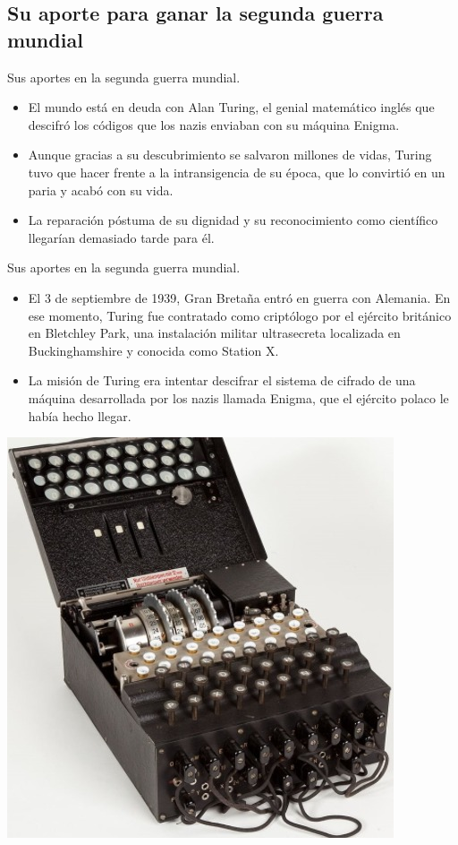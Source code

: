 \documentclass{beamer}
\begin{document}
\subsection{Su aporte para ganar la segunda guerra mundial}
\begin{frame}{Sus aportes en la segunda guerra mundial.}
    \begin{itemize}
        \item El mundo está en deuda con Alan Turing, el genial matemático inglés que descifró los códigos que los nazis enviaban con su máquina Enigma.\\\pause
        \item Aunque gracias a su descubrimiento se salvaron millones de vidas, Turing tuvo que hacer frente a la intransigencia de su época, que lo convirtió en un paria y acabó con su vida.\pause 
        \item La reparación póstuma de su dignidad y su reconocimiento como científico llegarían demasiado tarde para él.
    \end{itemize}
\end{frame}
\begin{frame}{Sus aportes en la segunda guerra mundial.}
    \begin{itemize}
        \item El 3 de septiembre de 1939, Gran Bretaña entró en guerra con Alemania. En ese momento, Turing fue contratado como criptólogo por el ejército británico en Bletchley Park, una instalación militar ultrasecreta localizada en Buckinghamshire y conocida como Station X.\pause 
        \item La misión de Turing era intentar descifrar el sistema de cifrado de una máquina desarrollada por los nazis llamada Enigma, que el ejército polaco le había hecho llegar.\pause 
    \end{itemize}
    \begin{center}
        \includegraphics[scale=0.25]{enigma.png}
    \end{center}
\end{frame}
\end{document}
